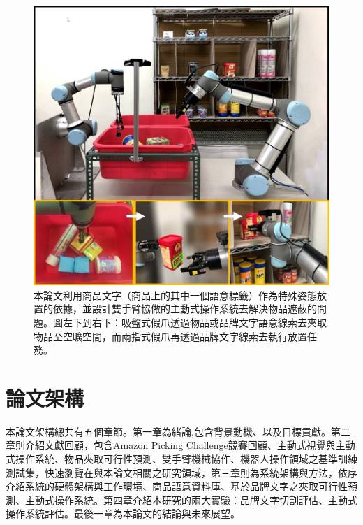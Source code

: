 \begin{figure}[ht]
	\centering
	\includegraphics[height=!, width=0.7\linewidth, keepaspectratio=true]
	{./figures/pose-aware-placing-teaser-v3.jpg}
  \caption{本論文利用商品文字（商品上的其中一個語意標籤）作為特殊姿態放置的依據，並設計雙手臂協做的主動式操作系統去解決物品遮蔽的問題。圖左下到右下：吸盤式假爪透過物品或品牌文字語意線索去夾取物品至空曠空間，而兩指式假爪再透過品牌文字線索去執行放置任務。}
  \label{figure:teaser}
\end{figure}

\section{論文架構}
本論文架構總共有五個章節。第一章為緒論,包含背景動機、以及目標貢獻。第二章則介紹文獻回顧，包含Amazon Picking Challenge競賽回顧、主動式視覺與主動式操作系統、物品夾取可行性預測、雙手臂機械協作、機器人操作領域之基準訓練測試集，快速瀏覽在與本論文相關之研究領域，第三章則為系統架構與方法，依序介紹系統的硬體架構與工作環境、商品語意資料庫、基於品牌文字之夾取可行性預測、主動式操作系統。第四章介紹本研究的兩大實驗：品牌文字切割評估、主動式操作系統評估。最後一章為本論文的結論與未來展望。
